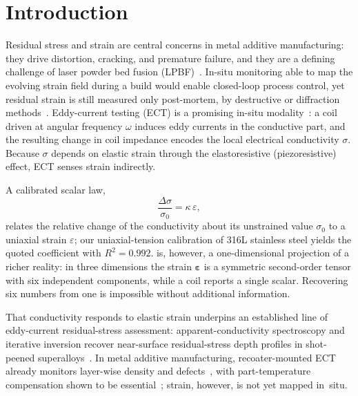 \documentclass[preprint]{elsarticle}
\newcommand{\dsig}{\Delta\sigma}
\newcommand{\eps}{\bm{\varepsilon}}
\begin{document}

\section{Introduction}\label{sec:intro}
Residual stress and strain are central concerns in metal additive
manufacturing: they drive distortion, cracking, and premature failure, and they
are a defining challenge of laser powder bed fusion
(LPBF)~\cite{bartlett2019}. In-situ monitoring able to map the evolving strain
field during a build would enable closed-loop process control, yet residual
strain is still measured only post-mortem, by destructive or diffraction
methods~\cite{withers2001}. Eddy-current testing (ECT) is a promising in-situ
modality~\cite{garcia2011}: a coil driven at angular frequency $\omega$ induces
eddy currents in the conductive part, and the resulting change in coil
impedance encodes the local electrical conductivity $\sigma$. Because $\sigma$
depends on elastic strain through the elastoresistive (piezoresistive) effect,
ECT senses strain indirectly.

A calibrated scalar law,
\begin{equation}
  \frac{\dsig}{\sigma_0} = \kappa\,\varepsilon,
  \label{eq:scalar}
\end{equation}
relates the relative change of the conductivity about its unstrained value
$\sigma_0$ to a uniaxial strain $\varepsilon$; our uniaxial-tension calibration
of 316L stainless steel yields the quoted coefficient with $R^2=0.992$.
 is, however, a one-dimensional projection of a richer reality:
in three dimensions the strain $\eps$ is a symmetric second-order tensor with
six independent components, while a coil reports a single scalar. Recovering
six numbers from one is impossible without additional information.

That conductivity responds to elastic strain underpins an established line of
eddy-current residual-stress assessment: apparent-conductivity spectroscopy and
iterative inversion recover near-surface residual-stress depth profiles in
shot-peened superalloys~\cite{yu2004,abunabah2006,abunabah2007}. 
In metal additive manufacturing, recoater-mounted ECT already monitors layer-wise
density and defects~\cite{spurek2022,monu2025}, with part-temperature
compensation shown to be essential~\cite{spurek2024}; strain, however, is not
yet mapped in~situ.
\end{document}
